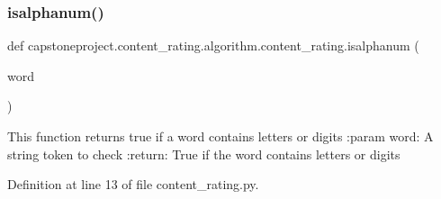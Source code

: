 \subsubsection{\texorpdfstring{isalphanum()}{isalphanum()}}
{\footnotesize\ttfamily def capstoneproject.\+content\+\_\+rating.\+algorithm.\+content\+\_\+rating.\+isalphanum (\begin{DoxyParamCaption}\item[{}]{word }\end{DoxyParamCaption})}

\begin{DoxyVerb}This function returns true if a word contains letters or digits
:param word: A string token to check
:return: True if the word contains letters or digits
\end{DoxyVerb}
 

Definition at line 13 of file content\+\_\+rating.\+py.

